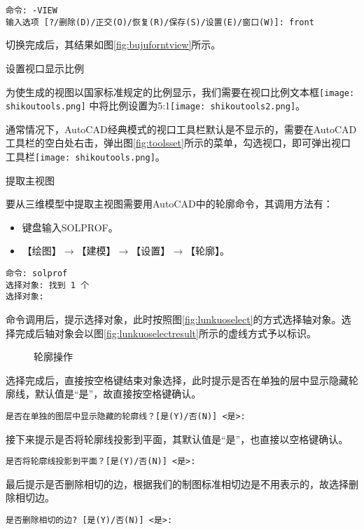 \begin{procedure}
\begin{lstlisting}
命令: -VIEW
输入选项 [?/删除(D)/正交(O)/恢复(R)/保存(S)/设置(E)/窗口(W)]: front
\end{lstlisting}

切换完成后，其结果如图\ref{fig:bujuforntview}所示。
\item 设置视口显示比例

为使生成的视图以国家标准规定的比例显示，我们需要在视口比例文本框\texttt{[image: shikoutools.png]}  中将比例设置为5:1\texttt{[image: shikoutools2.png]}。

通常情况下，AutoCAD经典模式的视口工具栏默认是不显示的，需要在AutoCAD工具栏的空白处右击，弹出图\ref{fig:toolsset}所示的菜单，勾选视口，即可弹出视口工具栏\texttt{[image: shikoutools.png]}。
\item 提取主视图

要从三维模型中提取主视图需要用AutoCAD中的轮廓命令，其调用方法有：
\begin{itemize}
\item 键盘输入SOLPROF。
\item 【绘图】$\rightarrow$【建模】$\rightarrow$【设置】$\rightarrow$【轮廓】。
\end{itemize}
\begin{lstlisting}
命令: solprof
选择对象: 找到 1 个
选择对象:
\end{lstlisting}

命令调用后，提示选择对象，此时按照图\ref{fig:lunkuoselect}的方式选择轴对象。选择完成后轴对象会以图\ref{fig:lunkuoselectresult}所示的虚线方式予以标识。
\begin{figure}[htbp]
\centering
{}
\hspace{20pt}
\caption{轮廓操作}
\end{figure}

选择完成后，直接按空格键结束对象选择，此时提示是否在单独的层中显示隐藏轮廓线，默认值是“是”，故直接按空格键确认。
\begin{lstlisting}
是否在单独的图层中显示隐藏的轮廓线？[是(Y)/否(N)] <是>:
\end{lstlisting}

接下来提示是否将轮廓线投影到平面，其默认值是“是”，也直接以空格键确认。
\begin{lstlisting}
是否将轮廓线投影到平面？[是(Y)/否(N)] <是>:
\end{lstlisting}

最后提示是否删除相切的边，根据我们的制图标准相切边是不用表示的，故选择删除相切边。
\begin{lstlisting}
是否删除相切的边? [是(Y)/否(N)] <是>:
\end{lstlisting}


\end{procedure}
